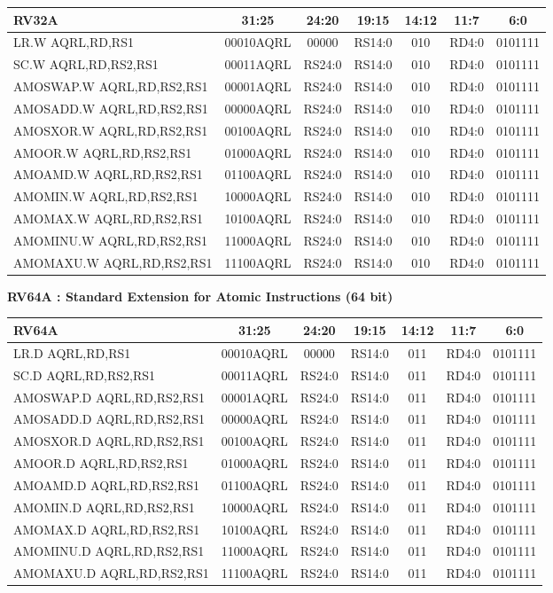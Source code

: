 \documentclass[
]{article}
\begin{document}
\begin{longtable}[]{@{}lcccccc@{}}
\toprule
RV32A & 31:25 & 24:20 & 19:15 & 14:12 & 11:7 & 6:0\tabularnewline
\midrule
\endhead
LR.W AQRL,RD,RS1 & 00010AQRL & 00000 & RS14:0 & 010 & RD4:0 &
0101111\tabularnewline
SC.W AQRL,RD,RS2,RS1 & 00011AQRL & RS24:0 & RS14:0 & 010 & RD4:0 &
0101111\tabularnewline
AMOSWAP.W AQRL,RD,RS2,RS1 & 00001AQRL & RS24:0 & RS14:0 & 010 & RD4:0 &
0101111\tabularnewline
AMOSADD.W AQRL,RD,RS2,RS1 & 00000AQRL & RS24:0 & RS14:0 & 010 & RD4:0 &
0101111\tabularnewline
AMOSXOR.W AQRL,RD,RS2,RS1 & 00100AQRL & RS24:0 & RS14:0 & 010 & RD4:0 &
0101111\tabularnewline
AMOOR.W AQRL,RD,RS2,RS1 & 01000AQRL & RS24:0 & RS14:0 & 010 & RD4:0 &
0101111\tabularnewline
AMOAMD.W AQRL,RD,RS2,RS1 & 01100AQRL & RS24:0 & RS14:0 & 010 & RD4:0 &
0101111\tabularnewline
AMOMIN.W AQRL,RD,RS2,RS1 & 10000AQRL & RS24:0 & RS14:0 & 010 & RD4:0 &
0101111\tabularnewline
AMOMAX.W AQRL,RD,RS2,RS1 & 10100AQRL & RS24:0 & RS14:0 & 010 & RD4:0 &
0101111\tabularnewline
AMOMINU.W AQRL,RD,RS2,RS1 & 11000AQRL & RS24:0 & RS14:0 & 010 & RD4:0 &
0101111\tabularnewline
AMOMAXU.W AQRL,RD,RS2,RS1 & 11100AQRL & RS24:0 & RS14:0 & 010 & RD4:0 &
0101111\tabularnewline
\bottomrule
\end{longtable}

\textbf{RV64A : Standard Extension for Atomic Instructions (64 bit)}

\begin{longtable}[]{@{}lcccccc@{}}
\toprule
RV64A & 31:25 & 24:20 & 19:15 & 14:12 & 11:7 & 6:0\tabularnewline
\midrule
\endhead
LR.D AQRL,RD,RS1 & 00010AQRL & 00000 & RS14:0 & 011 & RD4:0 &
0101111\tabularnewline
SC.D AQRL,RD,RS2,RS1 & 00011AQRL & RS24:0 & RS14:0 & 011 & RD4:0 &
0101111\tabularnewline
AMOSWAP.D AQRL,RD,RS2,RS1 & 00001AQRL & RS24:0 & RS14:0 & 011 & RD4:0 &
0101111\tabularnewline
AMOSADD.D AQRL,RD,RS2,RS1 & 00000AQRL & RS24:0 & RS14:0 & 011 & RD4:0 &
0101111\tabularnewline
AMOSXOR.D AQRL,RD,RS2,RS1 & 00100AQRL & RS24:0 & RS14:0 & 011 & RD4:0 &
0101111\tabularnewline
AMOOR.D AQRL,RD,RS2,RS1 & 01000AQRL & RS24:0 & RS14:0 & 011 & RD4:0 &
0101111\tabularnewline
AMOAMD.D AQRL,RD,RS2,RS1 & 01100AQRL & RS24:0 & RS14:0 & 011 & RD4:0 &
0101111\tabularnewline
AMOMIN.D AQRL,RD,RS2,RS1 & 10000AQRL & RS24:0 & RS14:0 & 011 & RD4:0 &
0101111\tabularnewline
AMOMAX.D AQRL,RD,RS2,RS1 & 10100AQRL & RS24:0 & RS14:0 & 011 & RD4:0 &
0101111\tabularnewline
AMOMINU.D AQRL,RD,RS2,RS1 & 11000AQRL & RS24:0 & RS14:0 & 011 & RD4:0 &
0101111\tabularnewline
AMOMAXU.D AQRL,RD,RS2,RS1 & 11100AQRL & RS24:0 & RS14:0 & 011 & RD4:0 &
0101111\tabularnewline
\bottomrule
\end{longtable}
\end{document}
